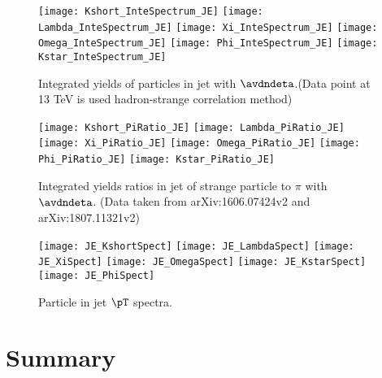 \documentclass[ALICE,manyauthors]{StrinJet}
\begin{document}
\begin{figure}[ht]
	\begin{center}
		\texttt{[image: Kshort\_InteSpectrum\_JE]}
		\texttt{[image: Lambda\_InteSpectrum\_JE]}
		\texttt{[image: Xi\_InteSpectrum\_JE]}
		\texttt{[image: Omega\_InteSpectrum\_JE]}
		\texttt{[image: Phi\_InteSpectrum\_JE]}
		\texttt{[image: Kstar\_InteSpectrum\_JE]}
	\end{center}
	\caption{Integrated yields of particles in jet with $\avdndeta$.(Data point at 13 TeV is used hadron-strange correlation method)}
	\label{fig:JCIntePar}
\end{figure}

\begin{figure}[ht]
	\begin{center}
		\texttt{[image: Kshort\_PiRatio\_JE]}
		\texttt{[image: Lambda\_PiRatio\_JE]}
		\texttt{[image: Xi\_PiRatio\_JE]}
		\texttt{[image: Omega\_PiRatio\_JE]}
		\texttt{[image: Phi\_PiRatio\_JE]}
		\texttt{[image: Kstar\_PiRatio\_JE]}
	\end{center}
	\caption{Integrated yields ratios in jet of strange particle to $\pi$ with $\avdndeta$. (Data taken from arXiv:1606.07424v2 and arXiv:1807.11321v2)}
	\label{fig:JEIntePartoPiRatio}
\end{figure}


\begin{figure}[ht]
	\begin{center}
		\texttt{[image: JE\_KshortSpect]}
		\texttt{[image: JE\_LambdaSpect]}
		\texttt{[image: JE\_XiSpect]}
		\texttt{[image: JE\_OmegaSpect]}
		\texttt{[image: JE\_KstarSpect]}
		\texttt{[image: JE\_PhiSpect]}
	\end{center}
	\caption{Particle in jet $\pT$ spectra.}
	\label{fig:JEParSpect}
\end{figure}



\section{Summary}
\label{sec:sum}
\end{document}
